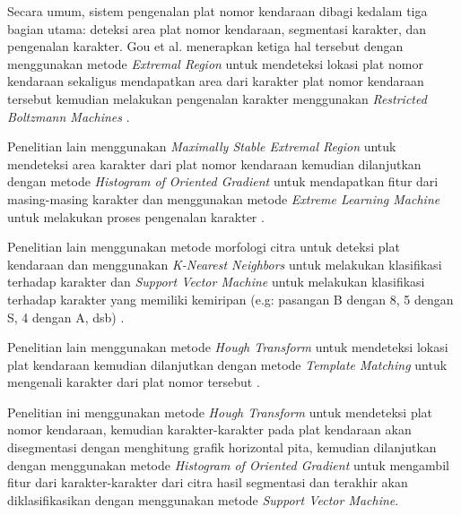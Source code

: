 \noindent Secara umum, sistem pengenalan plat nomor kendaraan dibagi kedalam tiga bagian utama: deteksi area plat nomor kendaraan, segmentasi karakter, dan pengenalan karakter. Gou et al. menerapkan ketiga hal tersebut dengan menggunakan metode \textit{Extremal Region} untuk mendeteksi lokasi plat nomor kendaraan sekaligus mendapatkan area dari karakter plat nomor kendaraan tersebut kemudian melakukan pengenalan karakter menggunakan \textit{Restricted Boltzmann Machines} \cite{gou2016}.

\noindent Penelitian lain menggunakan \textit{Maximally Stable Extremal Region} untuk mendeteksi area karakter dari plat nomor kendaraan kemudian dilanjutkan dengan metode \textit{Histogram of Oriented Gradient} untuk mendapatkan fitur dari masing-masing karakter dan menggunakan metode \textit{Extreme Learning Machine} untuk melakukan proses pengenalan karakter \cite{gou2014}.

\noindent Penelitian lain menggunakan metode morfologi citra untuk deteksi plat kendaraan dan menggunakan \textit{K-Nearest Neighbors} untuk melakukan klasifikasi terhadap karakter dan \textit{Support Vector Machine} untuk melakukan klasifikasi terhadap karakter yang memiliki kemiripan (e.g: pasangan B dengan 8, 5 dengan S, 4 dengan A, dsb) \cite{tabrizi}.

\noindent Penelitian lain menggunakan metode \textit{Hough Transform} untuk mendeteksi lokasi plat kendaraan kemudian dilanjutkan dengan metode \textit{Template Matching} untuk mengenali karakter dari plat nomor tersebut \cite{rasheed}. 

\noindent Penelitian ini menggunakan metode  \textit{Hough Transform} untuk mendeteksi plat nomor kendaraan, kemudian karakter-karakter pada plat kendaraan akan disegmentasi dengan menghitung grafik horizontal pita, kemudian dilanjutkan dengan menggunakan metode \textit{Histogram of Oriented Gradient} untuk mengambil fitur dari karakter-karakter dari citra hasil segmentasi dan terakhir akan diklasifikasikan dengan menggunakan metode \textit{Support Vector Machine}.


